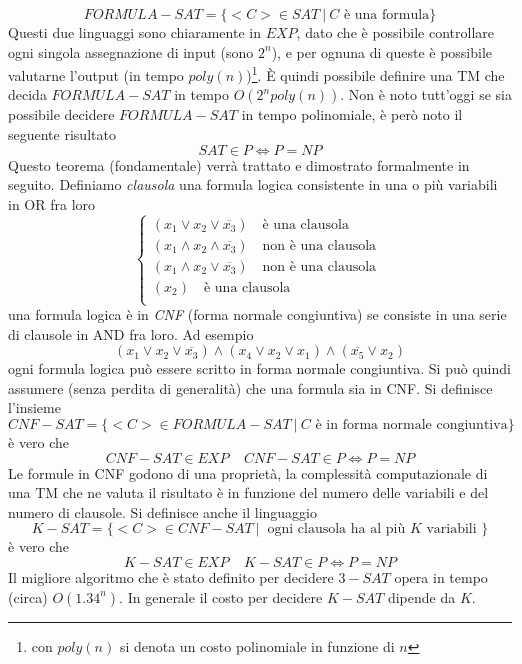 \documentclass[10pt, letterpaper]{report}
\begin{document}
$$ FORMULA-SAT = \{<C>\in SAT \ | \ C \text{ è una formula}\}$$
Questi due linguaggi sono chiaramente in $EXP$, dato che è possibile controllare ogni singola assegnazione di input (sono $2^n$), e per ognuna di queste è possibile valutarne l'output (in tempo $poly(n)$)\footnote{con $poly(n)$ si denota un costo polinomiale in funzione di $n$}. È quindi possibile definire una TM che decida $ FORMULA-SAT$ in tempo $O(2^npoly(n))$. \acc Non è noto tutt'oggi se sia possibile decidere $FORMULA-SAT$ in tempo polinomiale, è però noto il seguente risultato 
$$ SAT \in P \iff P=NP$$
Questo teorema (fondamentale) verrà trattato e dimostrato formalmente in seguito.\acc 
Definiamo \textit{clausola} una formula logica consistente in una o più variabili in OR fra loro $$ \begin{cases}
    (x_1 \lor x_2 \lor \overline{x_3}) \ \ \ \text{ è una clausola }\\ 
    (x_1 \land x_2 \land \overline{x_3})\ \ \ \text{ non è una clausola }\\ 
    (x_1 \land x_2 \lor \overline{x_3}) \ \ \ \text{ non è una clausola }\\ 
    ( x_2) \ \ \ \text{ è una clausola }\\ 
\end{cases}$$
 una formula logica è in \textit{CNF} (forma normale congiuntiva) se consiste in una serie di clausole in AND fra loro. Ad esempio  
$$ (x_1 \lor x_2 \lor \overline{x_3}) \land (x_4 \lor x_2 \lor {x_1}) \land  
(\overline{x_5} \lor x_2)$$
\prop{} ogni formula logica può essere scritto in forma normale congiuntiva. Si può quindi assumere (senza perdita di generalità) che una formula sia in CNF.\acc 
Si definisce l'insieme 
$$ CNF-SAT=\{<C>\in FORMULA-SAT \ | \ C \text{ è in forma normale congiuntiva}\}$$
è vero che 
$$ CNF-SAT \in EXP \ \ \ \ \ CNF-SAT \in P \iff P=NP$$
Le formule in CNF godono di una proprietà, la complessità computazionale di una TM che ne valuta il risultato è in funzione del numero delle variabili e del numero di clausole.\acc 
Si definisce anche il linguaggio 
$$ K-SAT = \{<C>\in CNF-SAT \ | \ \text{ ogni clausola ha al più }K\text{ variabili } \}$$è vero che 
$$ K-SAT \in EXP \ \ \ \ \ K-SAT \in P \iff P=NP$$
Il migliore algoritmo che è stato definito per decidere $3-SAT$ opera in tempo (circa) $O(1.34^n)$. In generale il costo per decidere $K-SAT$ dipende da $K$. 
\end{document}
